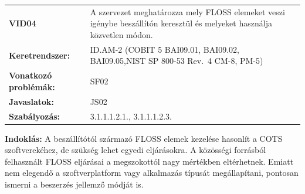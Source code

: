 \documentclass[12pt,magyar,a4paper,oneside]{scrreprt}
\begin{document}
\begin{longtable}[]{@{}ll@{}}
\toprule
\endhead
\begin{minipage}[t]{0.16\columnwidth}\raggedright
\textbf{VID04}\strut
\end{minipage} & \begin{minipage}[t]{0.79\columnwidth}\raggedright
A szervezet meghatározza mely FLOSS elemeket veszi igénybe beszállítón
keresztül és melyeket használja közvetlen módon.\strut
\end{minipage}\tabularnewline
\begin{minipage}[t]{0.16\columnwidth}\raggedright
\textbf{Keretrendszer:}\strut
\end{minipage} & \begin{minipage}[t]{0.79\columnwidth}\raggedright
ID.AM-2 (COBIT 5 BAI09.01, BAI09.02, BAI09.05,NIST SP 800-53 Rev.~4
CM-8, PM-5)\strut
\end{minipage}\tabularnewline
\begin{minipage}[t]{0.16\columnwidth}\raggedright
\textbf{Vonatkozó problémák:}\strut
\end{minipage} & \begin{minipage}[t]{0.79\columnwidth}\raggedright
SF02\strut
\end{minipage}\tabularnewline
\begin{minipage}[t]{0.16\columnwidth}\raggedright
\textbf{Javaslatok:}\strut
\end{minipage} & \begin{minipage}[t]{0.79\columnwidth}\raggedright
JS02\strut
\end{minipage}\tabularnewline
\begin{minipage}[t]{0.16\columnwidth}\raggedright
\textbf{Szabályozás:}\strut
\end{minipage} & \begin{minipage}[t]{0.79\columnwidth}\raggedright
3.1.1.1.2.1., 3.1.1.1.2.3.\strut
\end{minipage}\tabularnewline
\bottomrule
\end{longtable}

\textbf{Indoklás: } A beszállítótól származó FLOSS elemek kezelése
hasonlít a COTS szoftverekéhez, de szükség lehet egyedi eljárásokra. A
közösségi forrásból felhasznált FLOSS eljárásai a megszokottól nagy
mértékben eltérhetnek. Emiatt nem elegendő a szoftverplatform vagy
alkalmazás típusát megállapítani, pontosan ismerni a beszerzés jellemző
módját is.
\end{document}
